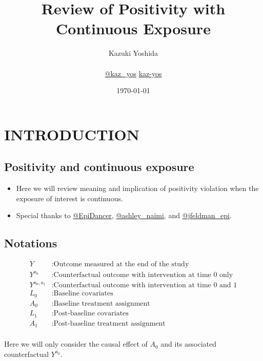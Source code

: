 \documentclass[dvipdfmx,10pt]{article}
\author{Kazuki Yoshida \\ \\ \faTwitter \href{https://twitter.com/kaz\_yos}{@kaz\_yos} \faGithub \href{https://github.com/kaz-yos/}{kaz-yos}}
\date{\today\\}
\title{Review of Positivity with Continuous Exposure}
\begin{document}
\maketitle
\sloppy
\section{INTRODUCTION}
\label{sec:org1bcd429}
\subsection{Positivity and continuous exposure}
\label{sec:orge8b1bb4}
\begin{itemize}
\item Here we will review meaning and implication of positivity violation when the exposure of interest is continuous.
\item Special thanks to \href{https://twitter.com/EpiDancer/status/1135741241386328065}{@EpiDancer}, \href{https://twitter.com/ashley\_naimi/status/1136045624724529153}{@ashley\_naimi}, and \href{https://twitter.com/jfeldman\_epi/status/1136116613630103553}{@jfeldman\_epi}.
\end{itemize}

\subsection{Notations}
\label{sec:orgc077cf2}
\begin{align*}
  Y &: \text{Outcome measured at the end of the study}\\
  Y^{a_{0}} &: \text{Counterfactual outcome with intervention at time 0 only}\\
  Y^{a_{0},a_{1}} &: \text{Counterfactual outcome with intervention at time 0 and 1}\\
  L_{0} &: \text{Baseline covariates}\\
  A_{0} &: \text{Baseline treatment assignment}\\
  L_{1} &: \text{Post-baseline covariates}\\
  A_{1} &: \text{Post-baseline treatment assignment}\\
\end{align*}

Here we will only consider the causal effect of \(A_{0}\) and its associated counterfactual \(Y^{a_{0}}\).
\end{document}
